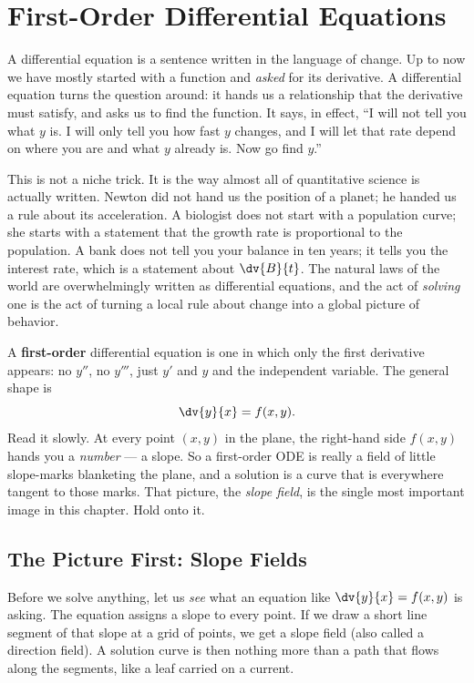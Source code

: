 \chapter{First-Order Differential Equations}

A differential equation is a sentence written in the language of change. Up to now
we have mostly started with a function and \emph{asked} for its derivative. A
differential equation turns the question around: it hands us a relationship that
the derivative must satisfy, and asks us to find the function. It says, in effect,
``I will not tell you what $y$ is. I will only tell you how fast $y$ changes, and I
will let that rate depend on where you are and what $y$ already is. Now go find
$y$.''

This is not a niche trick. It is the way almost all of quantitative science is
actually written. Newton did not hand us the position of a planet; he handed us a
rule about its acceleration. A biologist does not start with a population curve;
she starts with a statement that the growth rate is proportional to the population.
A bank does not tell you your balance in ten years; it tells you the interest rate,
which is a statement about $\dv{B}{t}$. The natural laws of the world are
overwhelmingly written as differential equations, and the act of \emph{solving}
one is the act of turning a local rule about change into a global picture of
behavior.

A \textbf{first-order} differential equation is one in which only the first
derivative appears: no $y''$, no $y'''$, just $y'$ and $y$ and the independent
variable. The general shape is
\[
  \dv{y}{x} = f(x, y).
\]
Read it slowly. At every point $(x,y)$ in the plane, the right-hand side $f(x,y)$
hands you a \emph{number} --- a slope. So a first-order ODE is really a field of
little slope-marks blanketing the plane, and a solution is a curve that is
everywhere tangent to those marks. That picture, the \emph{slope field}, is the
single most important image in this chapter. Hold onto it.

\section{The Picture First: Slope Fields}

Before we solve anything, let us \emph{see} what an equation like
$\dv{y}{x} = f(x,y)$ is asking. The equation assigns a slope to every point. If we
draw a short line segment of that slope at a grid of points, we get a slope field
(also called a direction field). A solution curve is then nothing more than a path
that flows along the segments, like a leaf carried on a current.

